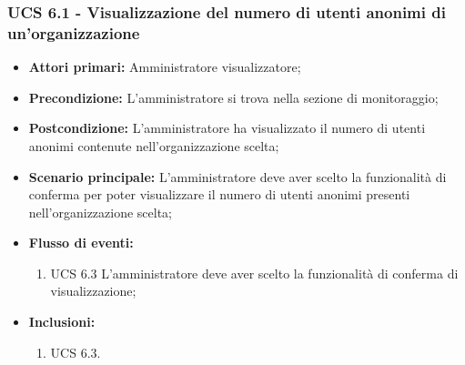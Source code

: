\subsubsection{UCS 6.1 - Visualizzazione del numero di utenti anonimi di un'organizzazione}%
\begin{itemize}
\item \textbf{Attori primari:} Amministratore visualizzatore;
\item \textbf{Precondizione:} L'amministratore si trova nella sezione di monitoraggio;
\item \textbf{Postcondizione:} L'amministratore ha visualizzato il numero di utenti anonimi contenute nell'organizzazione scelta;
\item \textbf{Scenario principale:} L'amministratore deve aver scelto la funzionalità di conferma per poter visualizzare il numero di utenti anonimi presenti nell'organizzazione scelta;
\item \textbf{Flusso di eventi:} 
\begin{enumerate}
	\item UCS 6.3 L'amministratore deve aver scelto la funzionalità di conferma di visualizzazione;
\end{enumerate}
\item \textbf{Inclusioni:}
\begin{enumerate}
	\item UCS 6.3.
\end{enumerate}
\end{itemize}

